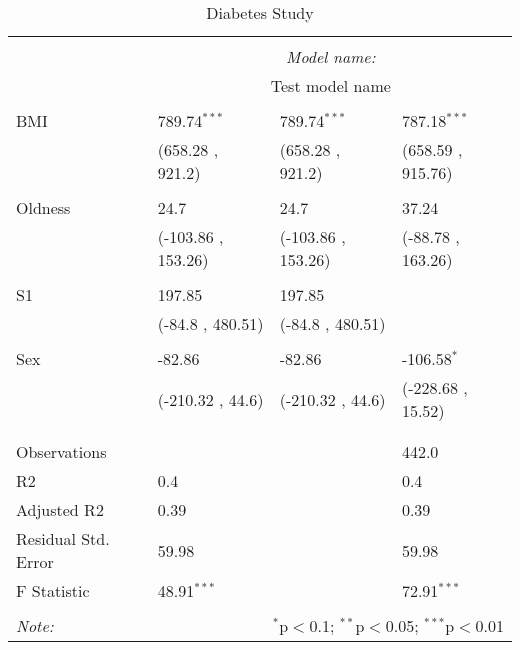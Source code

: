 \documentclass[12pt]{article}
\numberwithin{equation}{subsection}
\begin{document}
\begin{table}[!htbp] \centering
  \caption{Diabetes Study}
  \label{}
\begin{tabularx}{\textwidth}{lXXX}
\\[-1.8ex]\hline
\hline \\[-1.8ex]
& \multicolumn{3}{c}{\textit{Model name:}} \
\cr \cline{3-4}
\\[-1.8ex] & \multicolumn{3}{c}{Test model name} \\\hline \\[-1.8ex]
 BMI & 789.74$^{***}$ & 789.74$^{***}$ & 787.18$^{***}$ \\
  & (658.28 , 921.2) & (658.28 , 921.2) & (658.59 , 915.76) \\
  & & & \\
 Oldness & 24.7$^{}$ & 24.7$^{}$ & 37.24$^{}$ \\
  & (-103.86 , 153.26) & (-103.86 , 153.26) & (-88.78 , 163.26) \\
  & & & \\
 S1 & 197.85$^{}$ & 197.85$^{}$ & \\
  & (-84.8 , 480.51) & (-84.8 , 480.51) & \\
  & & & \\
 Sex & -82.86$^{}$ & -82.86$^{}$ & -106.58$^{*}$ \\
  & (-210.32 , 44.6) & (-210.32 , 44.6) & (-228.68 , 15.52) \\
  & & & \\
\hline \\[-1.8ex]
 Observations &   &   & 442.0 \\
 R${2}$ & 0.4 &   & 0.4 \\
 Adjusted R${2}$ & 0.39 &   & 0.39 \\
 Residual Std. Error & 59.98 &   & 59.98  \\
 F Statistic & 48.91$^{***}$  &     & 72.91$^{***}$  \\
\hline
\hline \\[-1.8ex]
\textit{Note:} & \multicolumn{3}{r}{$^{*}$p$<$0.1; $^{**}$p$<$0.05; $^{***}$p$<$0.01} \\
\end{tabularx}
\end{table}
\end{document}
